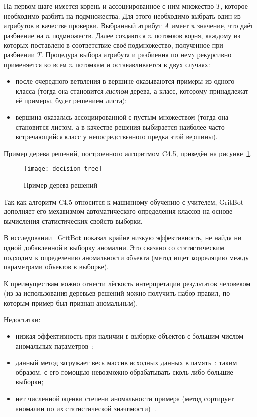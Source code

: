 На первом шаге имеется корень и ассоциированное с ним множество $T$, которое необходимо разбить на подмножества. Для этого необходимо выбрать один из атрибутов в качестве проверки. Выбранный атрибут $A$ имеет $n$ значение, что даёт разбиение на $n$ подмножеств. Далее создаются $n$ потомков корня, каждому из которых поставлено в соответствие своё подмножество, полученное при разбиении $T$. Процедура выбора атрибута и разбиения по нему рекурсивно применяется ко всем $n$ потомкам и останавливается в двух случаях:
\begin{itemize}
	\item после очередного ветвления в вершине оказываются примеры из одного класса (тогда она становится \textit{листом} дерева, а класс, которому принадлежат её примеры, будет решением листа);
	\item вершина оказалась ассоциированной с пустым множеством (тогда она становится листом, а в качестве решения выбирается наиболее часто встречающийся класс у непосредственного предка этой вершины).
\end{itemize}

Пример дерева решений, построенного алгоритмом C4.5, приведён на рисунке~\ref{fig:spec:DecisionTreeExample}.

\begin{figure}[h]
\texttt{[image: decision\_tree]}
\caption{Пример дерева решений} \label{fig:spec:DecisionTreeExample}
\end{figure}

Так как алгоритм C4.5 относится к машинному обучению с учителем, GritBot дополняет его механизмом автоматического определения классов на основе вычисления статистических свойств выборки.

В исследовании~\cite{MLInCyberTrust} GritBot показал крайне низкую эффективность, не найдя ни одной добавленной в выборку аномалии. Это связано со статистическим подходим к определению аномальности объекта (метод ищет корреляцию между параметрами объектов в выборке). 

К преимуществам можно отнести лёгкость интерпретации результатов человеком (из-за использования деревьев решений можно получить набор правил, по которым пример был признан аномальным).

Недостатки:
\begin{itemize}
	\item низкая эффективность при наличии в выборке объектов с большим числом аномальных параметров~\cite{MLInCyberTrust};
	\item данный метод загружает весь массив исходных данных в память~\cite{BaySchwabacherOrca}; таким образом, с его помощью невозможно обрабатывать сколь-либо большие выборки;
	\item нет численной оценки степени аномальности примера (метод сортирует аномалии по их статистической значимости)~\cite{MartinCompUnsupervisedDetectionMethods}.
\end{itemize}